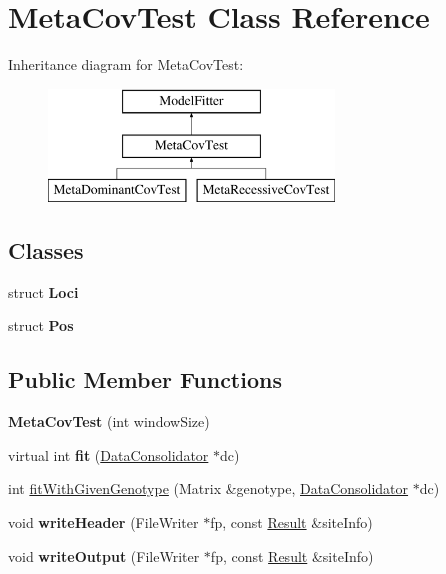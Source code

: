 \hypertarget{classMetaCovTest}{\section{Meta\-Cov\-Test Class Reference}
\label{classMetaCovTest}
}
Inheritance diagram for Meta\-Cov\-Test\-:\begin{figure}[H]
\begin{center}
\leavevmode
\includegraphics[height=3.000000cm]{classMetaCovTest}
\end{center}
\end{figure}
\subsection*{Classes}
\begin{DoxyCompactItemize}
\item 
struct {\bfseries Loci}
\item 
struct {\bfseries Pos}
\end{DoxyCompactItemize}
\subsection*{Public Member Functions}
\begin{DoxyCompactItemize}
\item 
\hypertarget{classMetaCovTest_a589b87655c0d10c98c4136268943794d}{{\bfseries Meta\-Cov\-Test} (int window\-Size)}\label{classMetaCovTest_a589b87655c0d10c98c4136268943794d}

\item 
\hypertarget{classMetaCovTest_a5a90d2fffcc1b8fde287fab7621aa91a}{virtual int {\bfseries fit} (\hyperlink{classDataConsolidator}{Data\-Consolidator} $\ast$dc)}\label{classMetaCovTest_a5a90d2fffcc1b8fde287fab7621aa91a}

\item 
int \hyperlink{classMetaCovTest_a23270f699cbcd9a3d4e6091da9cdd229}{fit\-With\-Given\-Genotype} (Matrix \&genotype, \hyperlink{classDataConsolidator}{Data\-Consolidator} $\ast$dc)
\item 
\hypertarget{classMetaCovTest_a05039515e319256c1f330bf7dc3d72af}{void {\bfseries write\-Header} (File\-Writer $\ast$fp, const \hyperlink{classResult}{Result} \&site\-Info)}\label{classMetaCovTest_a05039515e319256c1f330bf7dc3d72af}

\item 
\hypertarget{classMetaCovTest_aa6557da8838f8e59005796beda41be58}{void {\bfseries write\-Output} (File\-Writer $\ast$fp, const \hyperlink{classResult}{Result} \&site\-Info)}\label{classMetaCovTest_aa6557da8838f8e59005796beda41be58}

\end{DoxyCompactItemize}
